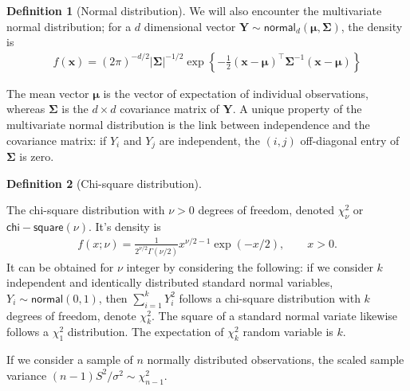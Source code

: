 \documentclass[
  11pt,
  letterpaper,
]{scrbook}
\theoremstyle{plain}
\theoremstyle{definition}
\theoremstyle{definition}
\newtheorem{definition}{Definition}[chapter]
\theoremstyle{remark}
\begin{document}
\begin{definition}[Normal
distribution]
We will also encounter the multivariate normal distribution; for a \(d\)
dimensional vector
\(\boldsymbol{Y} \sim \mathsf{normal}_d(\boldsymbol{\mu}, \boldsymbol{\Sigma})\),
the density is \begin{align*}
f(\boldsymbol{x}) = (2\pi)^{-d/2} |\boldsymbol{\Sigma}|^{-1/2} \exp \left\{ - \frac{1}{2} (\boldsymbol{x}-\boldsymbol{\mu})^\top \boldsymbol{\Sigma}^{-1}(\boldsymbol{x}-\boldsymbol{\mu})\right\}
\end{align*}

The mean vector \(\boldsymbol{\mu}\) is the vector of expectation of
individual observations, whereas \(\boldsymbol{\Sigma}\) is the
\(d \times d\) covariance matrix of \(\boldsymbol{Y}.\) A unique
property of the multivariate normal distribution is the link between
independence and the covariance matrix: if \(Y_i\) and \(Y_j\) are
independent, the \((i,j)\) off-diagonal entry of \(\boldsymbol{\Sigma}\)
is zero.

\end{definition}

\begin{definition}[Chi-square
distribution]\protect\hypertarget{def-chisquare-dist}{}\label{def-chisquare-dist}

The chi-square distribution with \(\nu>0\) degrees of freedom, denoted
\(\chi^2_\nu\) or \(\mathsf{chi-square}(\nu).\) It's density is
\begin{align*}
f(x; \nu) = \frac{1}{2^{\nu/2}\Gamma(\nu/2)}x^{\nu/2-1}\exp(-x/2),\qquad x >0.
\end{align*} It can be obtained for \(\nu\) integer by considering the
following: if we consider \(k\) independent and identically distributed
standard normal variables, \(Y_i \sim \mathsf{normal}(0, 1)\), then
\(\sum_{i=1}^k Y_i^2\) follows a chi-square distribution with \(k\)
degrees of freedom, denote \(\chi^2_k.\) The square of a standard normal
variate likewise follows a \(\chi^2_1\) distribution. The expectation of
\(\chi^2_k\) random variable is \(k.\)

\end{definition}

If we consider a sample of \(n\) normally distributed observations, the
scaled sample variance \((n-1)S^2/\sigma^2 \sim \chi^2_{n-1}.\)
\end{document}
